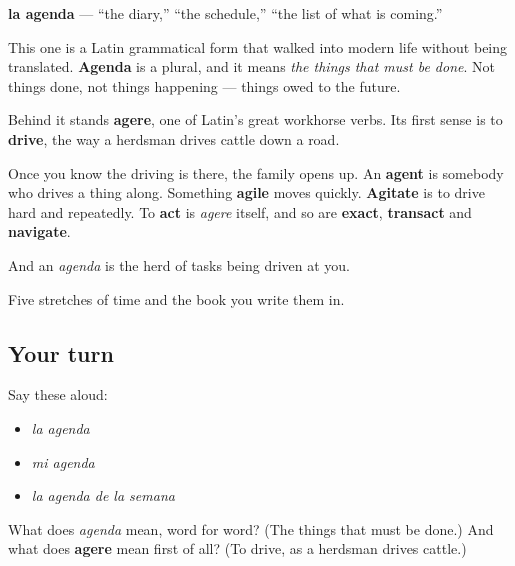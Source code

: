 \begin{cousinweb}
\textbf{la agenda} — \textquotedblleft{}the diary,\textquotedblright{} \textquotedblleft{}the schedule,\textquotedblright{} \textquotedblleft{}the list of what is coming.\textquotedblright{}

This one is a Latin grammatical form that walked into modern life without being translated. \textbf{Agenda} is a plural, and it means \emph{the things that must be done}. Not things done, not things happening — things owed to the future.

Behind it stands \textbf{agere}, one of Latin's great workhorse verbs. Its first sense is to \textbf{drive}, the way a herdsman drives cattle down a road.

Once you know the driving is there, the family opens up. An \textbf{agent} is somebody who drives a thing along. Something \textbf{agile} moves quickly. \textbf{Agitate} is to drive hard and repeatedly. To \textbf{act} is \emph{agere} itself, and so are \textbf{exact}, \textbf{transact} and \textbf{navigate}.

And an \emph{agenda} is the herd of tasks being driven at you.
\end{cousinweb}

\begin{grammarlens}[title={What you've built}]
Five stretches of time and the book you write them in.
\end{grammarlens}

\subsection*{Your turn}
Say these aloud:

\begin{itemize}
\raggedright
  \item \emph{la agenda}
  \item \emph{mi agenda}
  \item \emph{la agenda de la semana}
\end{itemize}

\begin{tcolorbox}[breakable,colback=teal!4,colframe=teal!35!black,title={Before you move on}]
What does \emph{agenda} mean, word for word? (The things that must be done.) And what does \textbf{agere} mean first of all? (To drive, as a herdsman drives cattle.)
\end{tcolorbox}

